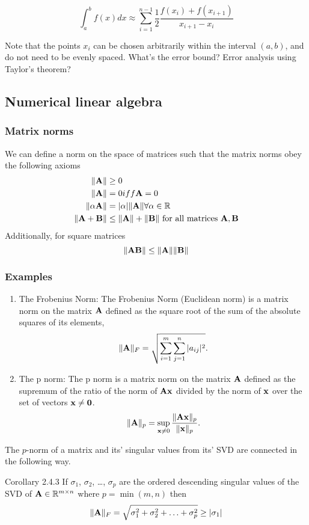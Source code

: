 \documentclass{amsart}[12pt]
\newcommand{\mgc}[1]{{\color{blue}#1}}
\begin{document}
\[
	\int_a^b f(x) dx \approx \sum_{i=1}^{n-1} \frac{1}{2} \frac{f(x_i) + f(x_{i+1})}{x_{i+1} - x_i}
\]

Note that the points $x_i$ can be chosen arbitrarily within the interval $(a, b)$, and do not need to be
evenly spaced. \mgc{What's the error bound? Error analysis using Taylor's theorem?}

\subsection{Numerical linear algebra}
\subsubsection{Matrix norms}
We can define a norm on the space of matrices such that the matrix norms obey the following axioms
\begin{align*}
	\|{\bf A}\| &\geq 0 \\
	\|{\bf A}\| &= 0 iff {\bf A} = 0 \\
	\|\alpha {\bf A}\| &= |\alpha| \|{\bf A}\| \forall \alpha \in {\mathbb{R}} \\
	\|{\bf A} + {\bf B}\| &\leq \|{\bf A}\| + \|{\bf B}\|\text{ for all matrices } {\bf A}, {\bf B}
\end{align*}
Additionally, for square matrices
\[
	\|{\bf A}{\bf B}\| \leq \|{\bf A}\| \|{\bf B}\|
\]
\subsubsection{Examples}

\begin{enumerate}
\item{The Frobenius Norm:}
The Frobenius Norm (Euclidean norm) is a matrix norm on the matrix ${\bf A}$ defined as the square root of the sum
of the absolute squares of its elements,
\[
	\|{\bf A}\|_F = \sqrt{\sum_{i=1}^m \sum_{j=1}^n |a_{ij}|^2}.
\]

\item{The p norm:}
The p norm is a matrix norm on the matrix ${\bf A}$ defined as the supremum of the ratio of the norm of
${\bf A} {\bf x}$ divided by the norm of ${\bf x}$ over the set of vectors ${\bf x} \ne {\bf0}$.
\[
	\|{\bf A}\|_p = \sup_{{\bf x} \ne 0} \frac{\|{\bf A} {\bf x}\|_p}{\|{\bf x}\|_p}.
\]
\end{enumerate}

The $p$-norm of a matrix and its' singular values from its' SVD are connected in the following way.

\cite{Golub:1996:MC:248979} Corollary 2.4.3 %
If $\sigma_1$, $\sigma_2$, \ldots, $\sigma_p$ are the ordered descending singular values of the SVD of ${\bf A}
\in {\mathbb{R}}^{m \times n}$ where $p = \min{(m, n)}$ then
\[
\|{\bf A}\|_F = \sqrt{\sigma_1^2 + \sigma_2^2 + \ldots + \sigma_p^2} \geq |\sigma_1|
\]
\end{document}
